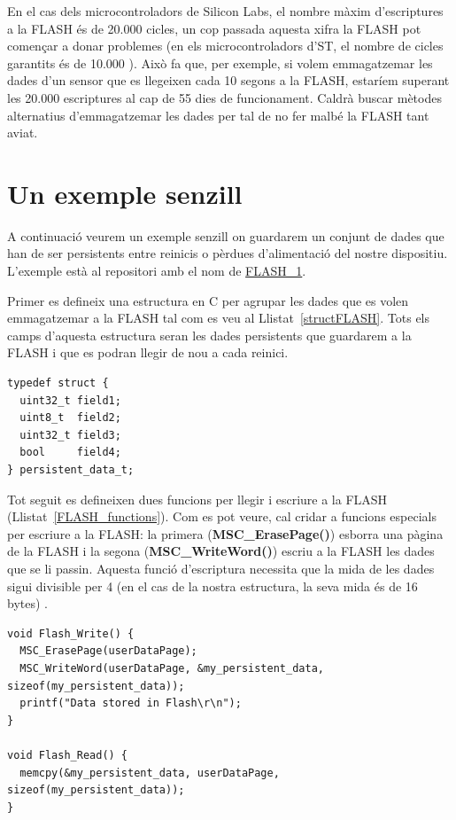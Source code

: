 En el cas dels microcontroladors de Silicon Labs, el nombre màxim d'escriptures a la \gls{FLASH} és de 20.000 cicles, un cop passada aquesta xifra la FLASH pot començar a donar problemes \cite[28]{EFM32ZG108DS} (en els microcontroladors d'ST, el nombre de cicles garantits és de 10.000 \cite[110]{STM32F4DS}). Això fa que, per exemple, si volem emmagatzemar les dades d'un sensor que es llegeixen cada 10 segons a la FLASH, estaríem superant les 20.000 escriptures al cap de 55 dies de funcionament. Caldrà buscar mètodes alternatius d'emmagatzemar les dades per tal de no fer malbé la \gls{FLASH} tant aviat.

\section{Un exemple senzill}
A continuació veurem un exemple senzill on guardarem un conjunt de dades que han de ser persistents entre reinicis o pèrdues d'alimentació del nostre dispositiu. L'exemple està al repositori amb el nom de \href{https://github.com/mariusmm/cursembedded/tree/master/Simplicity/FLASH_1}{FLASH\_1}.

Primer es defineix una estructura en C per agrupar les dades que es volen emmagatzemar a la \gls{FLASH} tal com es veu al Llistat~\ref{structFLASH}. Tots els camps d'aquesta estructura seran les dades persistents que guardarem a la FLASH i que es podran llegir de nou a cada reinici.
\begin{lstlisting}[style=customc,caption={Estructura per guardar-se a la FLASH},label=structFLASH]
typedef struct {
  uint32_t field1;
  uint8_t  field2;
  uint32_t field3;
  bool	   field4;
} persistent_data_t;
\end{lstlisting}

Tot seguit es defineixen dues funcions per llegir i escriure a la \gls{FLASH} (Llistat~\ref{FLASH_functions}). Com es pot veure, cal cridar a funcions especials per escriure a la FLASH: la primera ({\bf MSC\_ErasePage()}) esborra una pàgina de la FLASH i la segona ({\bf MSC\_WriteWord()}) escriu a la FLASH les dades que se li passin. Aquesta funció d'escriptura necessita que la mida de les dades sigui divisible per 4 (en el cas de la nostra estructura, la seva mida és de 16 bytes) \cite{FLASH_EFM32}\cite{EMLIB_MSC}.

\begin{lstlisting}[style=customc,caption={Funcions per accedir a la FLASH},label=FLASH_functions]
void Flash_Write() {
  MSC_ErasePage(userDataPage);
  MSC_WriteWord(userDataPage, &my_persistent_data, sizeof(my_persistent_data));
  printf("Data stored in Flash\r\n");
}

void Flash_Read() {
  memcpy(&my_persistent_data, userDataPage, sizeof(my_persistent_data));
}
\end{lstlisting}

